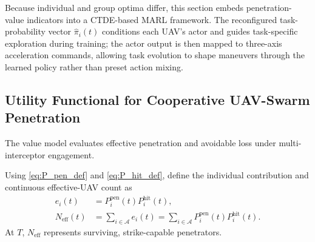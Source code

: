\documentclass[unbranded]{cja}
\begin{document}
Because individual and group optima differ, this section embeds penetration-value indicators into a CTDE-based MARL framework. The reconfigured task-probability vector $\hat{\pi}_i(t)$ conditions each UAV's actor and guides task-specific exploration during training; the actor output is then mapped to three-axis acceleration commands, allowing task evolution to shape maneuvers through the learned policy rather than preset action mixing.

\subsection{Utility Functional for Cooperative UAV-Swarm Penetration}

The value model evaluates effective penetration and avoidable loss under multi-interceptor engagement.

Using \eqref{eq:P_pen_def} and \eqref{eq:P_hit_def}, define the individual contribution and continuous effective-UAV count as
\begin{equation}
\begin{aligned}
e_i(t)
&=P_i^{\mathrm{pen}}(t)P_i^{\mathrm{hit}}(t),\\
N_{\mathrm{eff}}(t)
&=\sum_{i\in\mathcal A}e_i(t)
=\sum_{i\in\mathcal A}P_i^{\mathrm{pen}}(t)P_i^{\mathrm{hit}}(t).
\end{aligned}
\end{equation}
At $T$, $N_{\mathrm{eff}}$ represents surviving, strike-capable penetrators.
\end{document}
